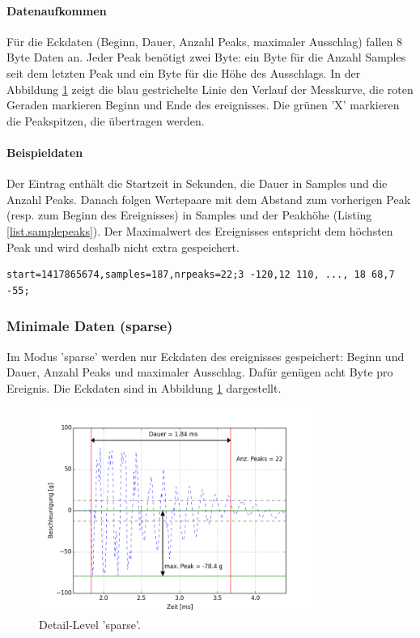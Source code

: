 \paragraph{Datenaufkommen} Für die Eckdaten (Beginn, Dauer, Anzahl Peaks, maximaler Ausschlag) fallen 8 Byte Daten an. Jeder Peak benötigt zwei Byte: ein Byte für die Anzahl Samples seit dem letzten Peak und ein Byte für die Höhe des Ausschlags. In der Abbildung \ref{fig.detailsparse} zeigt die blau gestrichelte Linie den Verlauf der Messkurve, die roten Geraden markieren Beginn und Ende des \gls{ereignis}ses. Die grünen 'X' markieren die Peakspitzen, die übertragen werden.

\paragraph{Beispieldaten} Der Eintrag enthält die Startzeit in Sekunden, die Dauer in Samples und die Anzahl Peaks. Danach folgen Wertepaare mit dem Abstand zum vorherigen Peak (resp. zum Beginn des Ereignisses) in Samples und der Peakhöhe (Listing \ref{list.samplepeaks}). Der Maximalwert des Ereignisses entspricht dem höchsten Peak und wird deshalb nicht extra gespeichert.

\begin{lstlisting}[caption=Beispieldaten auf Detail-Level 'peaks only', label=list.samplepeaks]
start=1417865674,samples=187,nrpeaks=22;3 -120,12 110, ..., 18 68,7 -55;
\end{lstlisting}

\subsubsection{Minimale Daten (sparse)}
Im Modus 'sparse' werden nur Eckdaten des \gls{ereignis}ses gespeichert: Beginn und Dauer, Anzahl Peaks und maximaler Ausschlag. Dafür genügen acht Byte pro Ereignis. Die Eckdaten sind in Abbildung \ref{fig.detailsparse} dargestellt.

\begin{figure}
	\centering
		\includegraphics[width=0.8\textwidth]{images/sparse.png}
	\caption{Detail-Level 'sparse'.}
	\label{fig.detailsparse}
\end{figure}

